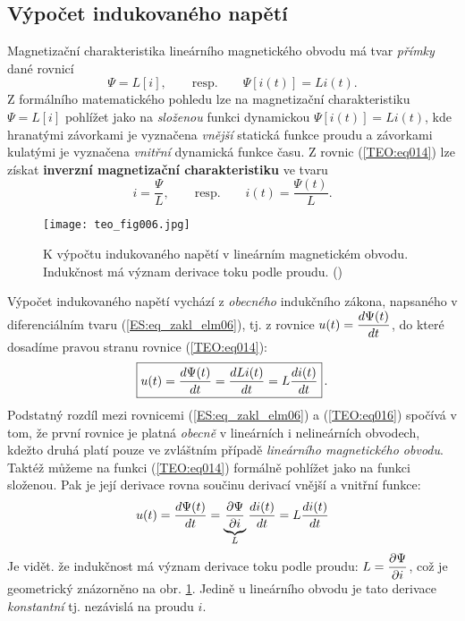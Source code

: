     \subsection{Výpočet indukovaného napětí}
      Magnetizační charakteristika lineárního magnetického obvodu má tvar \emph{přímky} dané rovnicí
      \begin{equation}\label{TEO:eq014}
        \Psi = L[i], \qquad\text{resp.}\qquad \Psi[i(t)] = Li(t).
      \end{equation}
      Z formálního matematického pohledu lze na magnetizační charakteristiku \(\Psi = L[i]\) 
      pohlížet jako na \emph{složenou} funkci dynamickou \(\Psi[i(t)] = Li(t)\), kde hranatými 
      závorkami je vyznačena \emph{vnější} statická funkce proudu a závorkami kulatými je vyznačena 
      \emph{vnitřní} dynamická funkce času. Z rovnic (\ref{TEO:eq014}) lze získat \textbf{inverzní 
      magnetizační charakteristiku} ve tvaru
      \begin{equation}\label{TEO:eq015}
        i = \frac{\Psi}{L}, \qquad\text{resp.}\qquad i(t) = \frac{\Psi(t)}{L}.
      \end{equation}
      
      \begin{figure}[ht!]  %
        \centering
        \texttt{[image: teo\_fig006.jpg]}
        \caption{K výpočtu indukovaného napětí v lineárním magnetickém obvodu. Indukčnost má význam 
                 derivace toku podle proudu.
                (\cite[s.~154]{Patocka4})}
        \label{teo:fig006}
      \end{figure}
      Výpočet indukovaného napětí vychází z \emph{obecného} indukčního zákona, napsaného v 
      diferenciálním tvaru (\ref{ES:eq_zakl_elm06}), tj. z rovnice \(u(t) = \dfrac{d \Psi(t)}{d t}\), do 
      které dosadíme pravou stranu rovnice (\ref{TEO:eq014}):
      \begin{equation}\label{TEO:eq016}
        \boxed{u(t) = \dfrac{d \Psi(t)}{d t} = \dfrac{d Li(t)}{d t} = L\dfrac{d i(t)}{d t}}\,.
      \end{equation}
      Podstatný rozdíl mezi rovnicemi (\ref{ES:eq_zakl_elm06}) a (\ref{TEO:eq016}) spočívá v tom, 
      že první rovnice je platná \emph{obecně} v lineárních i nelineárních obvodech, kdežto druhá 
      platí pouze ve zvláštním případě \emph{lineárního magnetického obvodu}. Taktéž můžeme na 
      funkci (\ref{TEO:eq014}) formálně pohlížet jako na funkci složenou. Pak je její derivace 
      rovna součinu derivací vnější a vnitřní funkce:
      \begin{equation}\label{TEO:eq017}
        u(t) = \dfrac{d \Psi(t)}{d t} = \underbrace{\dfrac{\partial \Psi}{\partial i}}_L\dfrac{d i(t)}{d t} = L\dfrac{d i(t)}{d t}
      \end{equation}
      Je vidět. že indukčnost má význam derivace toku podle proudu: \(L = \dfrac{\partial \Psi}{\partial i}\), což je 
      geometrický znázorněno na obr. \ref{teo:fig006}. Jedině u lineárního obvodu je tato derivace 
      \emph{konstantní} tj. nezávislá na proudu \(i\).
      
